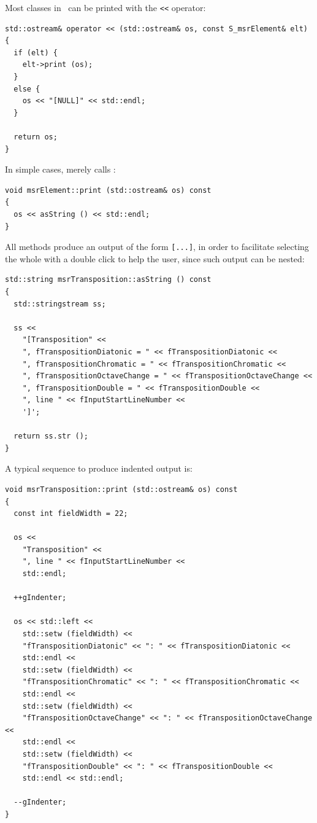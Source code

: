 Most classes in \mf\ can be printed with the {\tt <<} operator:
\begin{lstlisting}[language=CPlusPlus]
std::ostream& operator << (std::ostream& os, const S_msrElement& elt)
{
  if (elt) {
    elt->print (os);
  }
  else {
    os << "[NULL]" << std::endl;
  }

  return os;
}
\end{lstlisting}

In simple cases,  merely calls :
\begin{lstlisting}[language=CPlusPlus]
void msrElement::print (std::ostream& os) const
{
  os << asString () << std::endl;
}
\end{lstlisting}

All  methods produce an output of the form {\tt [...]}, in order to facilitate selecting the whole with a double click to help the user, since such output can be nested:
\begin{lstlisting}[language=CPlusPlus]
std::string msrTransposition::asString () const
{
  std::stringstream ss;

  ss <<
    "[Transposition" <<
    ", fTranspositionDiatonic = " << fTranspositionDiatonic <<
    ", fTranspositionChromatic = " << fTranspositionChromatic <<
    ", fTranspositionOctaveChange = " << fTranspositionOctaveChange <<
    ", fTranspositionDouble = " << fTranspositionDouble <<
    ", line " << fInputStartLineNumber <<
    ']';

  return ss.str ();
}
\end{lstlisting}

A typical sequence to produce indented output is:
\begin{lstlisting}[language=CPlusPlus]
void msrTransposition::print (std::ostream& os) const
{
  const int fieldWidth = 22;

  os <<
    "Transposition" <<
    ", line " << fInputStartLineNumber <<
    std::endl;

  ++gIndenter;

  os << std::left <<
    std::setw (fieldWidth) <<
    "fTranspositionDiatonic" << ": " << fTranspositionDiatonic <<
    std::endl <<
    std::setw (fieldWidth) <<
    "fTranspositionChromatic" << ": " << fTranspositionChromatic <<
    std::endl <<
    std::setw (fieldWidth) <<
    "fTranspositionOctaveChange" << ": " << fTranspositionOctaveChange <<
    std::endl <<
    std::setw (fieldWidth) <<
    "fTranspositionDouble" << ": " << fTranspositionDouble <<
    std::endl << std::endl;

  --gIndenter;
}
\end{lstlisting}


